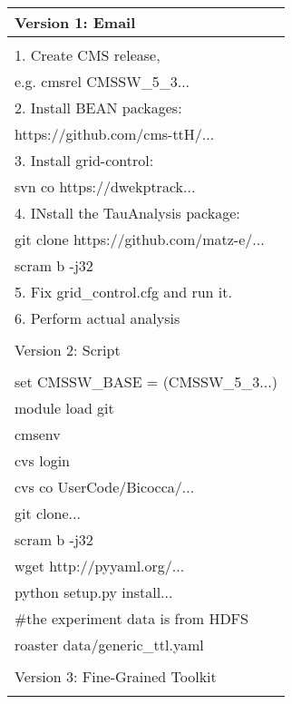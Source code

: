 \documentclass{acm_proc_article-sp}
\begin{document}
\begin{table}
    \centering
    \begin{tabular}{|l|}
        \hline
        Version 1: Email\\ \hline
        \\
        1. Create CMS release,\\
            \hspace{9pt} e.g. cmsrel CMSSW\_5\_3... \\
        2. Install BEAN packages: \\
            \hspace{9pt} https://github.com/cms-ttH/...\\
        3. Install grid-control: \\ 
            \hspace{9pt} svn co https://dwekptrack... \\
        4. INstall the TauAnalysis package: \\
           \hspace{9pt} git clone https://github.com/matz-e/... \\
           \hspace{9pt} scram b -j32 \\
        5. Fix grid\_control.cfg and run it. \\
        6. Perform actual analysis \\ 
        \\ \hline
        Version 2: Script\\ \hline
        \\
        set CMSSW\_BASE = (CMSSW\_5\_3...) \\
        module load git \\        
        cmsenv \\ 
        cvs login \\
        cvs co UserCode/Bicocca/... \\
        git clone... \\
        scram b -j32 \\
        wget http://pyyaml.org/... \\
        python setup.py install... \\
        \#the experiment data is from HDFS \\
        roaster data/generic\_ttl.yaml \\ 
        \\ \hline
        Version 3: Fine-Grained Toolkit\\ \hline
        \\

\end{tabular}
\end{table}
\end{document}
